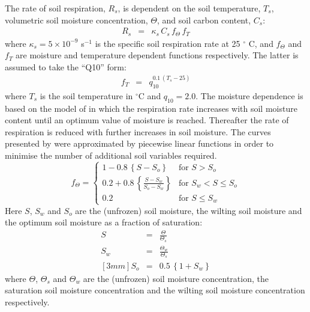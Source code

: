 \documentclass[a4paper]{article}
\begin{document}
The rate of soil respiration, $R_{s}$, is dependent on the soil
temperature, $T_{s}$, volumetric soil moisture concentration,
$\Theta$, and soil carbon content, $C_{s}$:
\begin{eqnarray}
R_{s} &=& \kappa_{s} \, C_{s} \, f_{\Theta} \, f_{T}
\end{eqnarray}
where $\kappa_{s}=5 \times 10^{-9}$ s$^{-1}$ is the specific soil
respiration rate at 25 $^{\circ}$ C, and $f_{\Theta}$ and $f_{T}$ are
moisture and temperature dependent functions respectively.  The latter
is assumed to take the ``Q10'' form:
\begin{eqnarray}
f_{T} &=& q_{10}^{0.1 \, (T_{s}-25)}
\end{eqnarray}
where $T_{s}$ is the soil temperature in $^{\circ}$C and
$q_{10}=2.0$. The moisture dependence is based on the model of
\citet{McG92} in which the respiration rate increases with soil
moisture content until an optimum value of moisture is
reached. Thereafter the rate of respiration is reduced with further
increases in soil moisture. The curves presented by \citet{McG92}
were approximated by piecewise linear functions in order to minimise
the number of additional soil variables required.
\begin{equation}
f_{\Theta} = \left \{ \begin{array}{lll}
         1 - 0.8 \, \left\{S - S_{o}\right\} & \mbox{for $S > S_{o}$}   \\ [5mm]
  0.2 + 0.8 \, \displaystyle{\left\{\frac{S-S_{w}}{S_{o}-S_{w}}\right\}}
     & \mbox{for $S_{w} < S \leq S_{o}$}  \\ [5mm]
              0.2 & \mbox{for $S \leq S_{w}$} \
             \end{array} \right.
\end{equation}
Here $S$, $S_{w}$ and $S_{o}$ are the (unfrozen) soil moisture, the
wilting soil moisture and the optimum soil moisture as a fraction of
saturation:
\begin{eqnarray}
S &=& \frac{\Theta}{\Theta_{s}} \\[3mm]
S_{w} &=& \frac{\Theta_{w}}{\Theta_{s}} \\ [3mm]
S_{o} &=& 0.5 \, \left\{1 + S_{w} \right\}
\end{eqnarray}
where $\Theta$, $\Theta_{s}$ and $\Theta_{w}$ are the (unfrozen) soil
moisture concentration, the saturation soil moisture concentration and
the wilting soil moisture concentration respectively. 
\end{document}

